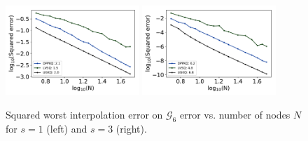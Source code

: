 \documentclass[twoside,11pt]{book}
\numberwithin{theorem}{chapter}
\numberwithin{definition}{chapter}
\numberwithin{proposition}{chapter}
\numberwithin{corollary}{chapter}
\numberwithin{example}{chapter}
\numberwithin{lemma}{chapter}
\numberwithin{assumption}{chapter}
\begin{document}
\begin{figure}
\centering
\includegraphics[width=0.45\textwidth]{img/neurips/Sobolev/suponunitball_interpolation_pSobolev_s_1_binarycubeM_64_fig_1.pdf}
\includegraphics[width=0.45\textwidth]{img/neurips/Sobolev/suponunitball_interpolation_pSobolev_s_3_binarycubeM_64_fig_1.pdf}\\
\caption{Squared worst interpolation error on $\mathcal{G}_{6}$ error vs. number of nodes $N$ for $s = 1$ (left) and $s=3$ (right).
\label{fig:pDPP_results_pSobolev_exp_3_G6}}
\end{figure}
\end{document}
